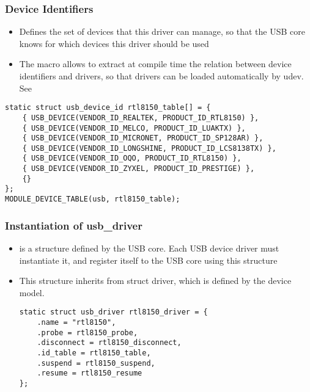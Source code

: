 \begin{frame}[fragile]
  \frametitle{Device Identifiers}
  \begin{itemize}
  \item Defines the set of devices that this driver can manage, so
    that the USB core knows for which devices this driver should be
    used
  \item The  macro allows  to
    extract at compile time the relation between device identifiers
    and drivers, so that drivers can be loaded automatically by
    udev. See 
  \end{itemize}
  \begin{verbatim}
static struct usb_device_id rtl8150_table[] = {
    { USB_DEVICE(VENDOR_ID_REALTEK, PRODUCT_ID_RTL8150) },
    { USB_DEVICE(VENDOR_ID_MELCO, PRODUCT_ID_LUAKTX) },
    { USB_DEVICE(VENDOR_ID_MICRONET, PRODUCT_ID_SP128AR) },
    { USB_DEVICE(VENDOR_ID_LONGSHINE, PRODUCT_ID_LCS8138TX) },
    { USB_DEVICE(VENDOR_ID_OQO, PRODUCT_ID_RTL8150) },
    { USB_DEVICE(VENDOR_ID_ZYXEL, PRODUCT_ID_PRESTIGE) },
    {}
};
MODULE_DEVICE_TABLE(usb, rtl8150_table);
  \end{verbatim}
\end{frame}

\begin{frame}[fragile]
  \frametitle{Instantiation of usb\_driver}
  \begin{itemize}
  \item {} is a structure defined by the USB
    core. Each USB device driver must instantiate it, and register
    itself to the USB core using this structure
  \item This structure inherits from struct driver, which is defined
    by the device model.
  \begin{verbatim}
static struct usb_driver rtl8150_driver = {
    .name = "rtl8150",
    .probe = rtl8150_probe,
    .disconnect = rtl8150_disconnect,
    .id_table = rtl8150_table,
    .suspend = rtl8150_suspend,
    .resume = rtl8150_resume
};
  \end{verbatim}
  \end{itemize}
\end{frame}

